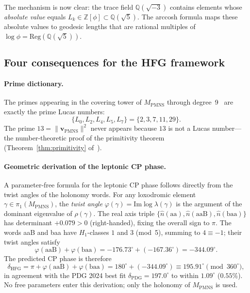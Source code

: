 ﻿\documentclass[12pt]{article}
\theoremstyle{definition}
\begin{document}
\medskip
The mechanism is now clear: the trace field $\mathbb{Q}(\sqrt{-3})$
contains elements whose \emph{absolute value} equals $L_k \in
\mathbb{Z}[\phi] \subset \mathbb{Q}(\sqrt{5})$. The arccosh formula
maps these absolute values to geodesic lengths that are rational
multiples of $\log\phi = \mathrm{Reg}(\mathbb{Q}(\sqrt{5}))$.

\subsection*{Four consequences for the HFG framework}

\paragraph{Prime dictionary.}
The primes appearing in the covering tower of $M_\mathrm{PMNS}$
through degree~9~\cite{Gentry:Covering} are exactly the prime Lucas
numbers:
\[
  \{L_0, L_2, L_4, L_5, L_7\} = \{2, 3, 7, 11, 29\}.
\]
The prime $13 = \|\mathbf{v}_\mathrm{PMNS}\|^2$ never appears because
$13$ is not a Lucas number---the number-theoretic proof of the
primitivity theorem (Theorem~\ref{thm:primitivity} of~\cite{Gentry:Covering}).


\paragraph{Geometric derivation of the leptonic CP phase.}
\label{par:cp_geometric}
A parameter-free formula for the leptonic CP phase follows directly from
the twist angles of the holonomy words. For any loxodromic element
$\gamma\in\pi_1(M_\mathrm{PMNS})$, the \emph{twist angle}
$\varphi(\gamma) = \mathrm{Im}\log\lambda(\gamma)$ is the argument of the
dominant eigenvalue of $\rho(\gamma)$. The real axis triple
$\{\hat{n}(\mathrm{aa}),\hat{n}(\mathrm{aaB}),\hat{n}(\mathrm{baa})\}$
has determinant $+0.079>0$ (right-handed), fixing the overall sign to $\pi$.
The words aaB and baa have $H_1$-classes $1$ and $3$ (mod~5), summing to
$4\equiv -1$; their twist angles satisfy
\[
  \varphi(\mathrm{aaB}) + \varphi(\mathrm{baa})
  = -176.73^\circ + (-167.36^\circ) = -344.09^\circ.
\]
The predicted CP phase is therefore
\[
  \boxed{\delta_\mathrm{HFG}
    = \pi + \varphi(\mathrm{aaB}) + \varphi(\mathrm{baa})
    = 180^\circ + (-344.09^\circ)
    \equiv 195.91^\circ \pmod{360^\circ},}
\]
in agreement with the PDG 2024 best fit $\delta_\mathrm{PDG} = 197.0^\circ$
to within $1.09^\circ$ ($0.55\%$). No free parameters enter this derivation;
only the holonomy of $M_\mathrm{PMNS}$ is used.
\end{document}
